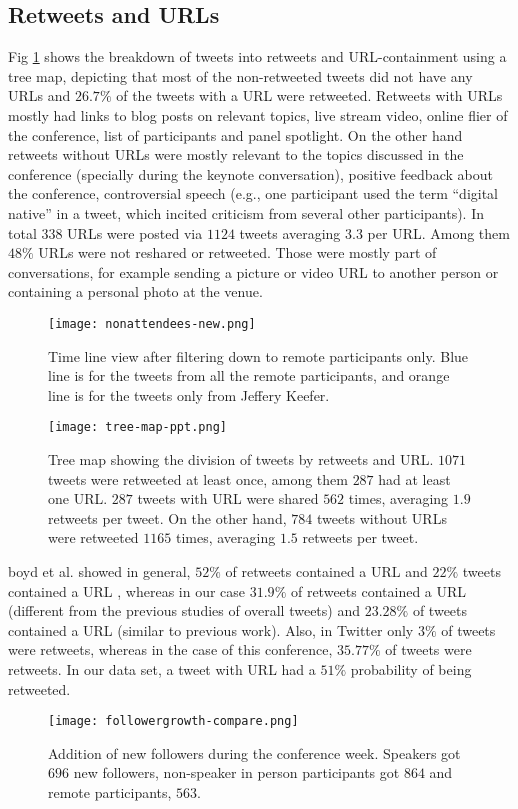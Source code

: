 \documentclass[conference,final]{IEEEtran}
\begin{document}
\subsection{Retweets and URLs}
Fig \ref{fig:urlretweets} shows the breakdown of tweets into retweets and URL-containment using a tree map, depicting that most of the non-retweeted tweets did not have any URLs and $26.7\%$ of the tweets with a URL were retweeted. Retweets with URLs mostly had links to blog posts on relevant topics, live stream video, online flier of the conference, list of participants and panel spotlight. On the other hand retweets without URLs were mostly relevant to the topics discussed in the conference (specially during the keynote conversation), positive feedback about the conference, controversial speech (e.g., one participant used the term ``digital native'' in a tweet, which incited criticism from several other participants). In total $338$ URLs were posted via $1124$ tweets averaging $3.3$ per URL. Among them $48\%$ URLs were not reshared or retweeted. Those were mostly part of conversations, for example sending a picture or video URL to another person or containing a personal photo at the venue.


\begin{figure}[htbp]
	\centering
		\texttt{[image: nonattendees-new.png]}		
		\addtolength{\belowcaptionskip}{8mm} 
	\caption{Time line view after filtering down to remote participants only. Blue line is for the tweets from all the remote participants, and orange line is for the tweets only from Jeffery Keefer.}
	\label{fig:nonattendees}

	\centering
		\texttt{[image: tree-map-ppt.png]}
	\caption{Tree map showing the division of tweets by retweets and URL. $1071$ tweets were retweeted at least once, among them $287$ had at least one URL. $287$ tweets with URL were shared $562$ times, averaging $1.9$ retweets per tweet. On the other hand, $784$ tweets without URLs were retweeted $1165$ times, averaging $1.5$ retweets per tweet.}
	\label{fig:urlretweets}
\end{figure}

boyd et al. showed in general, $52\%$ of retweets contained a URL and $22\%$ tweets contained a URL \cite{boyd2010tweet}, whereas in our case $31.9\%$ of retweets contained a URL (different from the previous studies of overall tweets) and $23.28\%$ of tweets contained a URL (similar to previous work). Also, in Twitter only $3\%$ of tweets were retweets, whereas in the case of this conference, $35.77\%$ of tweets were retweets. In our data set, a tweet with URL had a $51\%$ probability of being retweeted. 
\begin{figure}[htb]
	\centering
		\texttt{[image: followergrowth-compare.png]}
	\caption{Addition of new followers during the conference week. Speakers got $696$ new followers, non-speaker in person participants got $864$ and remote participants, $563$.}
	\label{fig:followergrowth-compare}
\end{figure}
\end{document}
